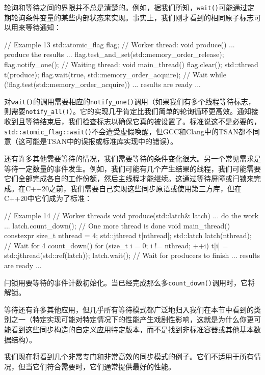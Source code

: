 轮询和等待之间的界限并不总是清楚的。例如，据我们所知，\texttt{wait()}可能通过定期轮询条件变量的某些内部状态来实现。事实上，我们刚才看到的相同原子标志可以用来等待通知：

\begin{code}
// Example 13
std::atomic_flag flag;
// Worker thread:
void produce() {
  ... produce the results ...
  flag.test_and_set(std::memory_order_release);
  flag.notify_one();
}
// Waiting thread:
void main_thread() {
  flag.clear();
  std::thread t(produce);
  flag.wait(true, std::memory_order_acquire); // Wait
  while (!flag.test(std::memory_order_acquire)) {}
  ... results are ready ...
}
\end{code}

对\texttt{wait()}的调用需要相应的\texttt{notify\_one()}调用（如果我们有多个线程等待标志，则需要\texttt{notify\_all()}）。它的实现几乎肯定比我们简单的轮询循环更高效。通知接收到且等待结束后，我们检查标志以确保它真的被设置了。标准说这不是必要的，\texttt{std::atomic\_flag::wait()}不会遭受虚假唤醒，但GCC和Clang中的TSAN都不同意（这可能是TSAN中的误报或标准库实现中的错误）。

还有许多其他需要等待的情况，我们需要等待的条件变化很大。另一个常见需求是等待一定数量的事件发生。例如，我们可能有几个产生结果的线程，我们可能需要它们全部完成各自的工作份额，然后主线程才能继续。这通过等待屏障或闩锁来完成。在C++20之前，我们需要自己实现这些同步原语或使用第三方库，但在C++20中它们成为了标准：

\begin{code}
// Example 14
// Worker threads
void produce(std::latch& latch) {
  ... do the work ...
  latch.count_down();     // One more thread is done
}
void main_thread() {
  constexpr size_t nthread = 4;
  std::jthread t[nthread];
  std::latch latch(nthread); // Wait for 4 count_down()
  for (size_t i = 0; i != nthread; ++i) {
    t[i] = std::jthread(std::ref(latch));
  }
  latch.wait();   // Wait for producers to finish
  ... results are ready ...
}
\end{code}

闩锁用要等待的事件计数初始化。当已经完成那么多\texttt{count\_down()}调用时，它将解锁。

等待还有许多其他应用，但几乎所有等待模式都广泛地归入我们在本节中看到的类别之一（特定实现可能对特定情况下的性能产生戏剧性影响，这就是为什么你更可能看到这些同步构造的自定义应用特定版本，而不是找到非标准容器或其他基本数据结构）。

我们现在将看到几个非常专门和非常高效的同步模式的例子。它们不适用于所有情况，但当它们符合需要时，它们通常提供最好的性能。

